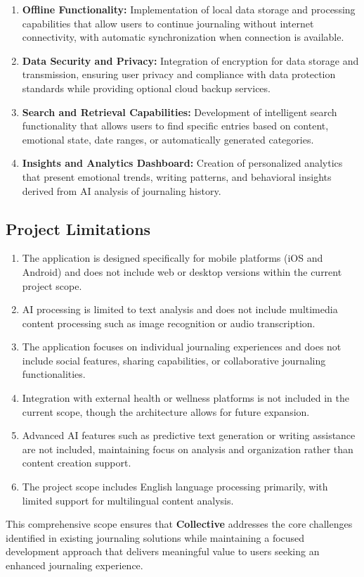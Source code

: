 \begin{enumerate}
	\item \textbf{Offline Functionality:} Implementation of local data storage and processing capabilities that allow users to continue journaling without internet connectivity, with automatic synchronization when connection is available.
	
	\item \textbf{Data Security and Privacy:} Integration of encryption for data storage and transmission, ensuring user privacy and compliance with data protection standards while providing optional cloud backup services.
	
	\item \textbf{Search and Retrieval Capabilities:} Development of intelligent search functionality that allows users to find specific entries based on content, emotional state, date ranges, or automatically generated categories.
	
	\item \textbf{Insights and Analytics Dashboard:} Creation of personalized analytics that present emotional trends, writing patterns, and behavioral insights derived from AI analysis of journaling history.
\end{enumerate}

\subsection{Project Limitations}\label{subsec:limitations}

\begin{enumerate}
	\item The application is designed specifically for mobile platforms (iOS and Android) and does not include web or desktop versions within the current project scope.
	
	\item AI processing is limited to text analysis and does not include multimedia content processing such as image recognition or audio transcription.
	
	\item The application focuses on individual journaling experiences and does not include social features, sharing capabilities, or collaborative journaling functionalities.
	
	\item Integration with external health or wellness platforms is not included in the current scope, though the architecture allows for future expansion.
	
	\item Advanced AI features such as predictive text generation or writing assistance are not included, maintaining focus on analysis and organization rather than content creation support.
	
	\item The project scope includes English language processing primarily, with limited support for multilingual content analysis.
\end{enumerate}

This comprehensive scope ensures that \textbf{Collective} addresses the core challenges identified in existing journaling solutions while maintaining a focused development approach that delivers meaningful value to users seeking an enhanced journaling experience.
